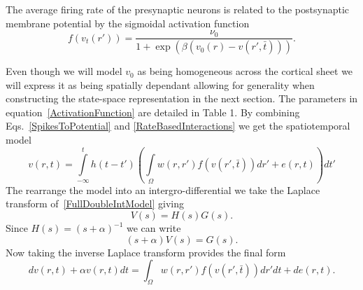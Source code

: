 \documentclass[onecolumn,draftcls]{IEEEtran}
\begin{document}
The average firing rate of the presynaptic neurons is related to the postsynaptic membrane potential by the sigmoidal activation function
\begin{equation}\label{ActivationFunction}
f\left( {{v_t}\left( {r'} \right)} \right) = \frac{{{\nu _0}}}{{1 + \exp \left( {\beta \left( {{v_0}\left( r \right) - {v}\left(r',\bar{t} \right)} \right)} \right)}}.
\end{equation}

Even though we will model  $v_0$ as being homogeneous across the cortical sheet we will express it as being spatially dependant allowing for generality when constructing the state-space representation in the next section. The parameters in equation~\ref{ActivationFunction} are detailed in Table 1. By combining Eqs.~\ref{SpikesToPotential} and \ref{RateBasedInteractions} we get the spatiotemporal model
\begin{equation}\label{FullDoubleIntModel}
v\left(r,t\right) = \int\limits_{-\infty}^t h\left(t - t'\right) \left(\int\limits_\Omega  w\left(r,r'\right)f\left( v\left( r',\bar t \right)\right)dr' + e\left(r,t\right)\right) dt'
\end{equation}
The rearrange the model into an intergro-differential we take the Laplace transform of~\ref{FullDoubleIntModel} giving
\begin{equation}
	V(s) = H(s)G(s).
\end{equation}
Since $H(s) = (s+\alpha)^{-1}$ we can write
\begin{equation}
	(s+\alpha)V(s) = G(s).
\end{equation}
Now taking the inverse Laplace transform provides the final form
\begin{equation}\label{FinalForm1}
dv\left( r,t \right) + \alpha v\left( r,t \right)dt = \int_\Omega  {w\left( r,r' \right)f\left( {v\left( r',\bar t \right)} \right)dr'dt}  +de\left( r,t \right).
\end{equation}
\end{document}
